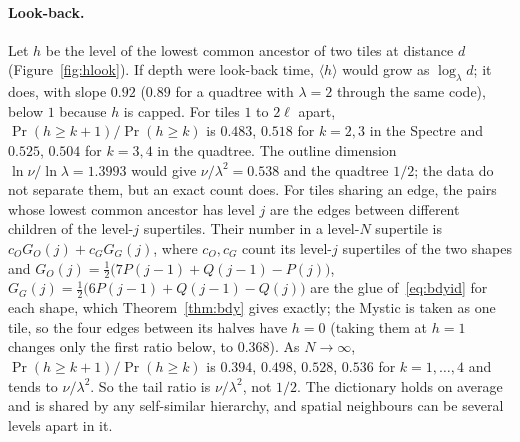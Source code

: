 \documentclass[11pt]{article}
\theoremstyle{definition}
\theoremstyle{remark}
\newcommand{\lam}{\lambda}
\begin{document}
\paragraph{Look-back.}  Let $h$ be the level of the lowest common ancestor of two tiles at distance $d$
(Figure~\ref{fig:hlook}).  If depth were look-back time, $\langle h\rangle$ would grow as $\log_\lam d$; it does, with slope
$0.92$ ($0.89$ for a quadtree with $\lam=2$ through the same code), below $1$ because $h$ is capped.  For tiles $1$ to $2\ell$
apart, $\Pr(h\ge k+1)/\Pr(h\ge k)$ is $0.483$, $0.518$ for $k=2,3$ in the Spectre and $0.525$, $0.504$ for $k=3,4$ in the quadtree.  The
outline dimension $\ln\nu/\ln\lam=1.3993$ would give $\nu/\lam^{2}=0.538$ and the quadtree $1/2$; the data do not separate
them, but an exact count does.  For tiles sharing an edge, the pairs whose lowest common ancestor has level $j$ are the
edges between different children of the level-$j$ supertiles.  Their number in a level-$N$ supertile is
$c_{O}G_{O}(j)+c_{G}G_{G}(j)$, where $c_{O},c_{G}$ count its level-$j$ supertiles of the two shapes and
$G_{O}(j)=\tfrac12\bigl(7P(j-1)+Q(j-1)-P(j)\bigr)$, $G_{G}(j)=\tfrac12\bigl(6P(j-1)+Q(j-1)-Q(j)\bigr)$
are the glue of~\eqref{eq:bdyid} for each shape, which Theorem~\ref{thm:bdy} gives exactly; the Mystic is taken as one
tile, so the four edges between its halves have $h=0$ (taking them at $h=1$ changes only the first ratio below, to
$0.368$).  As $N\to\infty$, $\Pr(h\ge k+1)/\Pr(h\ge k)$ is
$0.394$, $0.498$, $0.528$, $0.536$ for $k=1,\dots,4$ and tends to $\nu/\lam^{2}$.  So the tail ratio is $\nu/\lam^{2}$,
not $1/2$.
The dictionary holds on average and is shared by any self-similar hierarchy, and spatial neighbours can be several levels
apart in it.
\end{document}
